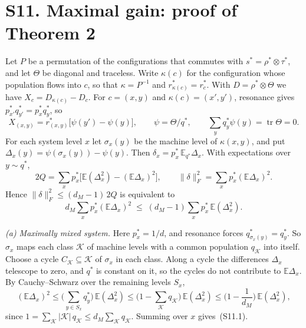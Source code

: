 \documentclass[aps,prl,reprint,superscriptaddress,amsmath,amssymb]{revtex4-2}
\newcommand{\Tr}{\operatorname{tr}}
\begin{document}
\section{S11. Maximal gain: proof of Theorem 2}
Let $P$ be a permutation of the configurations that commutes with $s^*=\rho^*\otimes\tau^*$, and let $\Theta$ be
diagonal and traceless. Write $\kappa(c)$ for the configuration whose population flows into $c$, so that
$\kappa=P^{-1}$ and $r^*_{\kappa(c)}=r^*_c$. With $D=\rho^*\otimes\Theta$ we have $X_c=D_{\kappa(c)}-D_c$. For
$c=(x,y)$ and $\kappa(c)=(x',y')$, resonance gives $p^*_{x'}q^*_{y'}=p^*_xq^*_y$, so
\[
X_{(x,y)}=r^*_{(x,y)}\big[\psi(y')-\psi(y)\big],\qquad \psi=\Theta/q^*,\qquad \textstyle\sum_yq^*_y\psi(y)=\Tr\Theta=0 .
\]
For each system level $x$ let $\sigma_x(y)$ be the machine level of $\kappa(x,y)$, and put
$\Delta_x(y)=\psi(\sigma_x(y))-\psi(y)$. Then $\delta_x=p^*_x\,\mathbb E_{q^*}\Delta_x$. With expectations over $y\sim q^*$,
\[
2Q=\sum_xp^*_x\Big[\mathbb E(\Delta_x^2)-(\mathbb E\Delta_x)^2\Big],\qquad
\|\delta\|_F^2=\sum_xp^*_x(\mathbb E\Delta_x)^2 .
\]
Hence $\|\delta\|_F^2\leq(d_M-1)\,2Q$ is equivalent to
\begin{equation}
d_M\sum_xp^*_x(\mathbb E\Delta_x)^2\;\leq\;(d_M-1)\sum_xp^*_x\,\mathbb E(\Delta_x^2).
\tag{S11.1}
\end{equation}

\emph{(a) Maximally mixed system.} Here $p^*_x=1/d$, and resonance forces $q^*_{\sigma_x(y)}=q^*_y$. So $\sigma_x$
maps each class $\mathcal K$ of machine levels with a common population $q_{\mathcal K}$ into itself. Choose a cycle
$C_{\mathcal K}\subseteq\mathcal K$ of $\sigma_x$ in each class. Along a cycle the differences $\Delta_x$ telescope to
zero, and $q^*$ is constant on it, so the cycles do not contribute to $\mathbb E\Delta_x$. By Cauchy--Schwarz over the
remaining levels $S_x$,
\[
(\mathbb E\Delta_x)^2\leq\Big(\sum_{y\in S_x}q^*_y\Big)\,\mathbb E(\Delta_x^2)
\leq\Big(1-\sum_{\mathcal K}q_{\mathcal K}\Big)\,\mathbb E(\Delta_x^2)\leq\Big(1-\frac1{d_M}\Big)\,\mathbb E(\Delta_x^2),
\]
since $1=\sum_{\mathcal K}|\mathcal K|\,q_{\mathcal K}\leq d_M\sum_{\mathcal K}q_{\mathcal K}$. Summing over $x$
gives~(S11.1).
\end{document}
